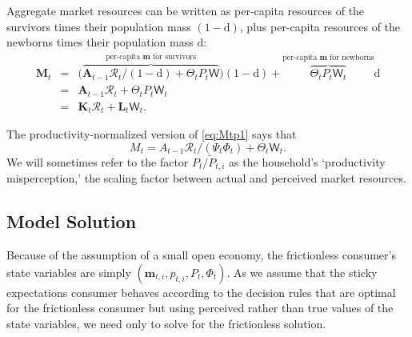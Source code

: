 \documentclass[titlepage]{article}
\begin{document}
Aggregate market resources can be written as per-capita resources of the survivors times their population mass $(1-\mathrm{d})$, plus per-capita resources of the newborns times their population mass $\mathrm{d}$:
\begin{eqnarray}
  \mathbf{M}_{t} & = & \big(\overbrace{\mathbf{A}_{t-1} {\mathscr{R}}_t/(1-\mathrm{d})  + \Theta_{t} {P}_{t}\mathsf{W}}^{\text{per-capita $\mathbf{m}$ for survivors}}\big)(1-\mathrm{d})+\overbrace{\Theta_{t} {P}_{t}\mathsf{W}_t}^{\text{per-capita $\mathbf{m}$ for newborns}} \mathrm{d} \nonumber \\
                       & = & \mathbf{A}_{t-1} {\mathscr{R}}_t + \Theta_{t} P_t \mathsf{W}_t  \label{eq:Mtp1} \\
                       & = & \mathbf{K}_t \mathscr{R}_t + \mathbf{L}_t \mathsf{W}_t. \nonumber
\end{eqnarray}
 

The productivity-normalized version of \eqref{eq:Mtp1} says that
\begin{equation}\label{eq:Mtp1norm}
M_t = A_{t-1} \mathscr{R}_t\big/(\Psi_t \Phi_t) + \Theta_t \mathsf{W}_t.
\end{equation}
We will sometimes refer to the factor $P_t\big/\widetilde{P}_{t,i}$ as the household's `productivity misperception,' the scaling factor between actual and perceived market resources.

\subsection{Model Solution}

Because of the assumption of a small open economy, the frictionless consumer's state variables are simply $(\mathbf{m}_{t,i},p_{t,i},P_t,\Phi_t)$.  As we assume that the sticky expectations consumer behaves according to the decision rules that are optimal for the frictionless consumer but using perceived rather than true values of the state variables, we need only to solve for the frictionless solution.
\end{document}
